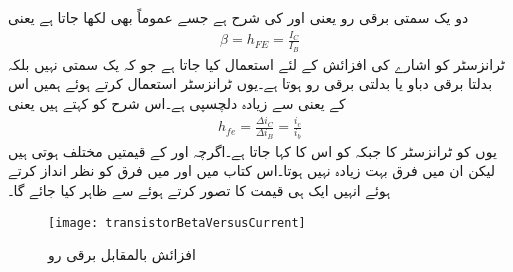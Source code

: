  دو یک سمتی برقی رو یعنی  اور  کی شرح ہے  جسے عموماً  بھی لکھا جاتا ہے یعنی 
\begin{align}
\beta = h_{FE}=\frac{I_C}{I_B}
\end{align}
ٹرانزسٹر کو اشارے کی افزائش کے لئے استعمال کیا جاتا ہے جو کہ یک سمتی نہیں بلکہ بدلتا برقی دباو یا بدلتی برقی رو ہوتا ہے۔یوں ٹرانزسٹر استعمال کرتے ہوئے ہمیں اس کے  یعنی  سے زیادہ دلچسپی ہے۔اس شرح کو  کہتے ہیں یعنی
\begin{align}
h_{fe}=\frac{\Delta i_C}{\Delta i_B}=\frac{i_c}{i_b}
\end{align}
یوں  کو ٹرانزسٹر کا  جبکہ  کو اس کا  کہا جاتا ہے۔اگرچہ  اور  کے قیمتیں مختلف ہوتی ہیں لیکن ان میں فرق بہت زیادہ نہیں ہوتا۔اس کتاب میں  اور  میں فرق کو نظر انداز کرتے ہوئے انہیں ایک ہی قیمت کا تصور کرتے ہوئے  سے ظاہر کیا جائے گا۔
\begin{figure}
\centering
\texttt{[image: transistorBetaVersusCurrent]}
\caption{افزائش بالمقابل برقی رو}
\label{شکل_افزائش_بالمقابم_برقی_رو}
\end{figure}

